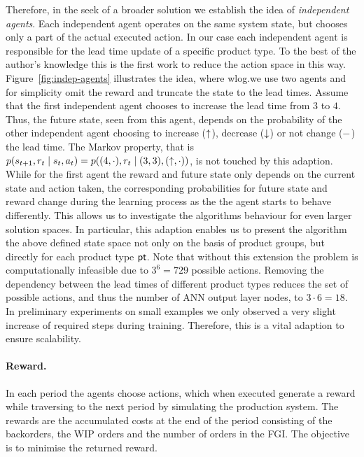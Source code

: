 \documentclass[envcountsame]{llncs}
\begin{document}
\begin{figure*}[t!]
  \centering
  \caption{Illustration of independent agents as agent one increases the lead time}\label{fig:indep-agents}
\end{figure*}
%
Therefore, in the seek of a broader solution we establish the idea of \textit{independent agents}.
Each independent agent operates on the same system state, but chooses only a part of the actual
executed action. In our case each independent agent is responsible for the lead time update of a
specific product type. To the best of the author's knowledge this is the first work to reduce the
action space in this way. Figure~\ref{fig:indep-agents} illustrates the idea, where wlog.\@ we use
two agents and for simplicity omit the reward and truncate the state to the lead times. Assume that
the first independent agent chooses to increase the lead time from \(3\) to \(4\). Thus, the future
state, seen from this agent, depends on the probability of the other independent agent choosing to
increase (\(\uparrow\)), decrease (\(\downarrow\)) or not change (\(-\)) the lead time. The Markov
property, that is
\(p(s_{t+1}, r_{t} \mid s_{t}, a_{t}) = p((4,\cdot), r_{t} \mid (3,3), (\uparrow, \cdot)) \), is not
touched by this adaption. While for the first agent the reward and future state only depends on the
current state and action taken, the corresponding probabilities for future state and reward change
during the learning process as the the agent starts to behave differently.
%
This allows us to investigate the algorithms behaviour for even larger solution spaces. In
particular, this adaption enables us to present the algorithm the above defined state space not only
on the basis of product groups, but directly for each product type \(\mathsf{pt}\). Note that without this
extension the problem is computationally infeasible due to \(3^{6} = 729\) possible actions.
Removing the dependency between the lead times of different product types reduces the set of
possible actions, and thus the number of ANN output layer nodes, to \(3 \cdot 6 = 18\). In
preliminary experiments on small examples we only observed a very slight increase of required steps
during training. Therefore, this is a vital adaption to ensure scalability.

\paragraph*{Reward.}
In each period the agents choose actions, which when executed generate a reward while traversing to
the next period by simulating the production system. The rewards are the accumulated costs at the
end of the period consisting of the backorders, the WIP orders and the number of orders in the
FGI\@. The objective is to minimise the returned reward. %
\end{document}
